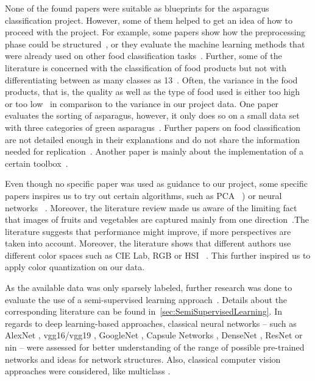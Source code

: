 \bigskip
None of the found papers were suitable as blueprints for the asparagus classification project. However, some of them helped to get an idea of how to proceed with the project. For example, some papers show how the preprocessing phase could be structured~\citep{mery2013automated}, or they evaluate the machine learning methods that were already used on other food classification tasks~\citep{bhargava2018fruits}. Further, some of the literature is concerned with the classification of food products but not with differentiating between as many classes as 13~\citep{diaz2004comparison,kilicc2007classification}. Often, the variance in the food products, that is, the quality as well as the type of food used is either too high~\citep{zhang2012classification} or too low~\citep{kilicc2007classification,al2011dates} in comparison to the variance in our project data.  One paper evaluates the sorting of asparagus, however, it only does so on a small data set with three categories of green asparagus~\citep{donis2016classification}. Further papers on food classification are not detailed enough in their explanations and do not share the information needed for replication~\citep{pedreschi2016grading}. Another paper is mainly about the implementation of a certain toolbox~\citep{mery2013automated}.

Even though no specific paper was used as guidance to our project, some specific papers inspires us to try out certain algorithms, such as PCA ~\citep{Vijayarekha2008, Zhu2007}) or neural networks ~\citep{Jhuria2013, Pujari2014}. Moreover, the literature review made us aware of the limiting fact that images of fruits and vegetables are captured mainly from one direction~\citep{bhargava2018fruits}.The literature suggests that performance might improve, if more perspectives are taken into account. Moreover, the literature shows that different authors use different color spaces such as CIE Lab, RGB or HSI ~\citep{Liming2010, Garrido-Novell2012, Kondo2010}. This further inspired us to apply color quantization on our data.

\bigbreak
As the available data was only sparsely labeled, further research was done to evaluate the use of a semi-supervised learning approach~\citep{olivier2006semi,zhu05survey}. Details about the corresponding literature can be found in~\autoref{sec:SemiSupervisedLearning}. In regards to deep learning-based approaches, classical neural networks -- such as AlexNet \citep{alexnet2012original}, \acrshort{vgg}16/\acrshort{vgg}19 \citep{vgg2014original}, GoogleNet \citep{googlenet2015original}, Capsule Networks \citep{capsulenet2017original},  DenseNet \citep{densenet2017original}, ResNet \citep{resnet2016original} or \acrfull{nin} \citep{lin2013network} -- were assessed for better understanding of the range of possible pre-trained networks and ideas for network structures. Also, classical computer vision approaches were considered, like multiclass  \citep{prakash2012multi}.
